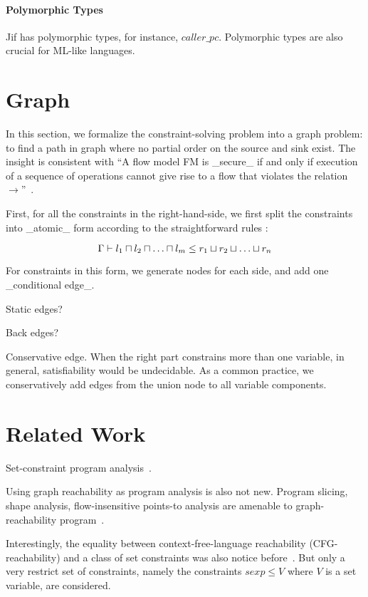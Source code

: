 \paragraph{Polymorphic Types}

Jif has polymorphic types, for instance, $caller\_pc$. Polymorphic
types are also crucial for ML-like languages.

\section{Graph} 

In this section, we formalize the constraint-solving problem into a
graph problem: to find a path in graph where no partial order on the
source and sink exist. The insight is consistent with ``A flow model
FM is _secure_ if and only if execution of a sequence of operations
cannot give rise to a flow that violates the relation
$\rightarrow$''~\cite{denning-lattice}.

First, for all the constraints in the right-hand-side, we
first split the constraints into _atomic_ form according to the
straightforward rules :

\[
\G \proves l_1 \meet l_2 \meet \dots \meet l_m \leq r_1 \join r_2 \join \dots
\join r_n
\]

For constraints in this form, we generate nodes for each side, and
add one _conditional edge_.

Static edges?

Back edges?

 Conservative edge. When the right part constrains more
than one variable, in general, satisfiability would be undecidable. As
a common practice, we conservatively add edges from the
union node to all variable components.

\section{Related Work}

Set-constraint program analysis~\cite{aiken-setconstraint}.

Using graph reachability as program analysis is also not
new. Program slicing, shape analysis, flow-insensitive points-to
analysis are amenable to graph-reachability program~\cite{reps-graph}.

Interestingly, the equality between context-free-language reachability
(CFG-reachability) and a class of set constraints was also notice
before~\cite{melski-cflgraph}. But only a very restrict set of
constraints, namely the constraints $sexp \leq V$ where $V$ is a
set variable, are considered.

